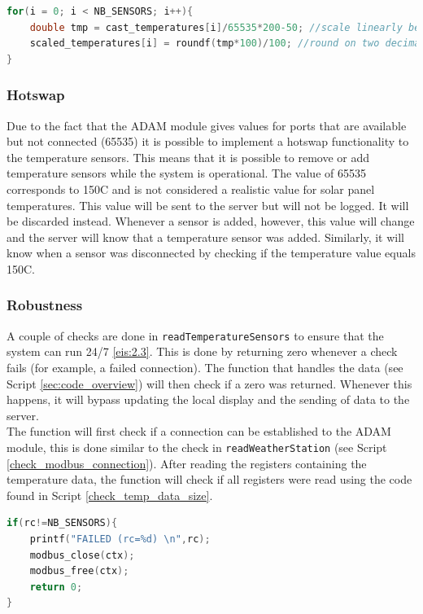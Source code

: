 \scriptsize
\begin{lstlisting}[language=C,caption={Function used to scale temperature data},label={scaleTempData}]
for(i = 0; i < NB_SENSORS; i++){
    double tmp = cast_temperatures[i]/65535*200-50; //scale linearly between -50 and 150 degrees
    scaled_temperatures[i] = roundf(tmp*100)/100; //round on two decimals
}
\end{lstlisting}
\normalsize

\subsubsection{Hotswap}
Due to the fact that the ADAM module gives values for ports that are available but not connected (65535) it is possible to implement a hotswap functionality to the temperature sensors. This means that it is possible to remove or add temperature sensors while the system is operational. The value of 65535 corresponds to 150\degree C and is not considered a realistic value for solar panel temperatures. This value will be sent to the server but will not be logged. It will be discarded instead. Whenever a sensor is added, however, this value will change and the server will know that a temperature sensor was added. Similarly, it will know when a sensor was disconnected by checking if the temperature value equals 150\degree C.

\subsubsection{Robustness}
A couple of checks are done in \verb|readTemperatureSensors| to ensure that the system can run 24/7 \ref{eis:2.3}. This is done by returning zero whenever a check fails (for example, a failed connection). The function that handles the data (see Script \ref{sec:code_overview}) will then check if a zero was returned. Whenever this happens, it will bypass updating the local display and the sending of data to the server.\\

The function will first check if a connection can be established to the ADAM module, this is done similar to the check in \verb|readWeatherStation| (see Script \ref{check_modbus_connection}). After reading the registers containing the temperature data, the function will check if all registers were read using the code found in Script \ref{check_temp_data_size}.

\scriptsize
\begin{lstlisting}[language=C,caption={Checking if the received data corresponds to the amount of requested registers},label={check_temp_data_size}]
if(rc!=NB_SENSORS){
	printf("FAILED (rc=%d) \n",rc);
	modbus_close(ctx);
	modbus_free(ctx);
	return 0;
}
\end{lstlisting}
\normalsize
